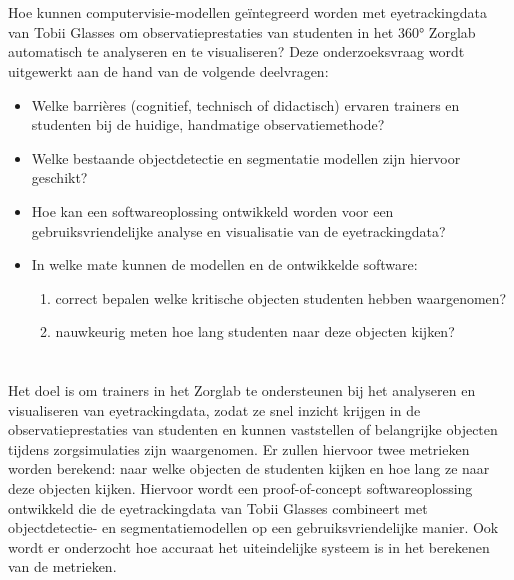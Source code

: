 \section{}%
\label{sec:onderzoeksvraag}

Hoe kunnen computervisie-modellen geïntegreerd worden met eyetrackingdata van Tobii Glasses om observatieprestaties van studenten in het 360° Zorglab automatisch te analyseren en te visualiseren?
Deze onderzoeksvraag wordt uitgewerkt aan de hand van de volgende deelvragen:
\begin{itemize}
    \item Welke barrières (cognitief, technisch of didactisch) ervaren trainers en studenten bij de huidige, handmatige observatiemethode?
    \item Welke bestaande objectdetectie en segmentatie modellen zijn hiervoor geschikt?
    \item Hoe kan een softwareoplossing ontwikkeld worden voor een gebruiksvriendelijke analyse en visualisatie van de eyetrackingdata?
    \item In welke mate kunnen de modellen en de ontwikkelde software:
        \begin{enumerate}
            \item correct bepalen welke kritische objecten studenten hebben waargenomen?
            \item nauwkeurig meten hoe lang studenten naar deze objecten kijken?
        \end{enumerate}
\end{itemize}

\section{}%
\label{sec:onderzoeksdoelstelling}

Het doel is om trainers in het Zorglab te ondersteunen bij het analyseren en visualiseren van eyetrackingdata, zodat ze snel inzicht krijgen in de observatieprestaties van studenten en kunnen 
vaststellen of belangrijke objecten tijdens zorgsimulaties zijn waargenomen. Er zullen hiervoor twee metrieken worden berekend: naar welke objecten de studenten kijken en hoe lang ze naar deze objecten kijken.
Hiervoor wordt een proof-of-concept softwareoplossing ontwikkeld die de eyetrackingdata van Tobii Glasses combineert met objectdetectie- en segmentatiemodellen op een gebruiksvriendelijke manier.
Ook wordt er onderzocht hoe accuraat het uiteindelijke systeem is in het berekenen van de metrieken.

